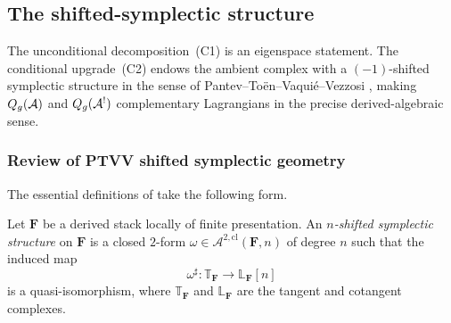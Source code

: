 %
%

\subsection{The shifted-symplectic structure}
\label{subsec:thqg-III-shifted-symplectic}

The unconditional decomposition~(C1) is an eigenspace statement.
The conditional upgrade~(C2) endows the ambient complex with a
$(-1)$-shifted symplectic structure in the sense of
Pantev--To\"{e}n--Vaqui\'{e}--Vezzosi \cite{PTVV13}, making
$Q_g(\mathcal{A})$ and $Q_g(\mathcal{A}^!)$ complementary Lagrangians in the
precise derived-algebraic sense.

\subsubsection{Review of PTVV shifted symplectic geometry}

The essential definitions of \cite{PTVV13} take the following
form.

\begin{definition}
\label{def:thqg-III-shifted-symplectic}
Let $\mathbf{F}$ be a derived stack locally of finite
presentation. An \emph{$n$-shifted symplectic structure} on
$\mathbf{F}$ is a closed $2$-form
$\omega \in \mathcal{A}^{2,\mathrm{cl}}(\mathbf{F}, n)$
of degree $n$ such that the induced map
\begin{equation}%
\omega^{\sharp}
\colon
\mathbb{T}_{\mathbf{F}} \longrightarrow
\mathbb{L}_{\mathbf{F}}[n]
\end{equation}
is a quasi-isomorphism, where $\mathbb{T}_{\mathbf{F}}$ and
$\mathbb{L}_{\mathbf{F}}$ are the tangent and cotangent
complexes.
\end{definition}

